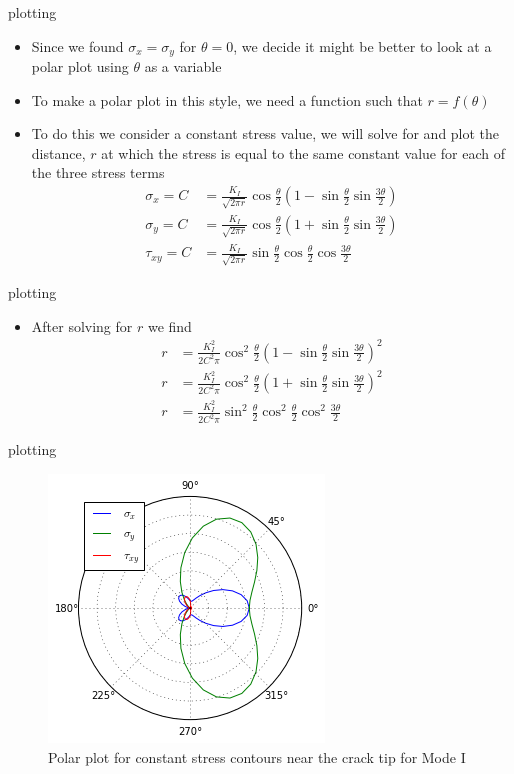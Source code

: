\documentclass[10pt]{beamer}
\begin{document}
\begin{frame}{plotting}
	\begin{itemize}
		\item Since we found $\sigma_x = \sigma_y$ for $\theta=0$, we decide it might be better to look at a polar plot using $\theta$ as a variable
		\item To make a polar plot in this style, we need a function such that $r = f(\theta)$
		\item To do this we consider a constant stress value, we will solve for and plot the distance, $r$ at which the stress is equal to the same constant value for each of the three stress terms
		\begin{align*}
		\sigma_x = C &= \frac{K_I}{\sqrt{2\pi r}} \cos \frac{\theta}{2} \left(1-\sin \frac{\theta}{2}\sin \frac{3\theta}{2}\right)\\
		\sigma_y = C &= \frac{K_I}{\sqrt{2\pi r}} \cos \frac{\theta}{2} \left(1+\sin \frac{\theta}{2}\sin \frac{3\theta}{2}\right)\\
		\tau_{xy} = C &= \frac{K_I}{\sqrt{2\pi r}} \sin \frac{\theta}{2} \cos \frac{\theta}{2}\cos \frac{3\theta}{2}
		\end{align*}
	\end{itemize}
\end{frame}

\begin{frame}{plotting}
	\begin{itemize}
		\item After solving for $r$ we find
		\begin{align*}
		r &= \frac{K_I^2}{2 C^2 \pi} \cos^2 \frac{\theta}{2} \left(1-\sin \frac{\theta}{2}\sin \frac{3\theta}{2}\right)^2\\
		r &= \frac{K_I^2}{2 C^2 \pi} \cos^2 \frac{\theta}{2} \left(1+\sin \frac{\theta}{2}\sin \frac{3\theta}{2}\right)^2\\
		r &= \frac{K_I^2}{2 C^2 \pi} \sin^2 \frac{\theta}{2} \cos^2 \frac{\theta}{2}\cos^2 \frac{3\theta}{2}
		\end{align*}
	\end{itemize}
\end{frame}

\begin{frame}{plotting}
	\begin{figure}
	\centering
	\includegraphics[width=0.7\linewidth]{polar_plot}
	\caption{Polar plot for constant stress contours near the crack tip for Mode I}
	\label{fig:polar_plot}
	\end{figure}
\end{frame}
\end{document}
